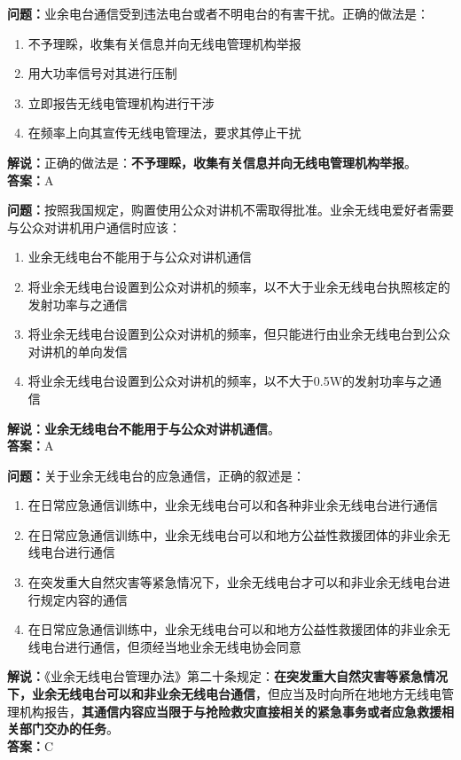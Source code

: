 \bigskip


\noindent\textbf{问题：}业余电台通信受到违法电台或者不明电台的有害干扰。正确的做法是：
\begin{enumerate}[label=\Alph*), leftmargin=3em]
	\item 不予理睬，收集有关信息并向无线电管理机构举报
	\item 用大功率信号对其进行压制
	\item 立即报告无线电管理机构进行干涉
	\item 在频率上向其宣传无线电管理法，要求其停止干扰
\end{enumerate}
\noindent\textbf{解说：}正确的做法是：\textbf{不予理睬，收集有关信息并向无线电管理机构举报}。\\\noindent\textbf{答案：}A


\bigskip


\noindent\textbf{问题：}按照我国规定，购置使用公众对讲机不需取得批准。业余无线电爱好者需要与公众对讲机用户通信时应该：
\begin{enumerate}[label=\Alph*), leftmargin=3em]
	\item 业余无线电台不能用于与公众对讲机通信
	\item 将业余无线电台设置到公众对讲机的频率，以不大于业余无线电台执照核定的发射功率与之通信
	\item 将业余无线电台设置到公众对讲机的频率，但只能进行由业余无线电台到公众对讲机的单向发信
	\item 将业余无线电台设置到公众对讲机的频率，以不大于0.5W的发射功率与之通信
\end{enumerate}
\noindent\textbf{解说：}\textbf{业余无线电台不能用于与公众对讲机通信}。\\\noindent\textbf{答案：}A


\bigskip


\noindent\textbf{问题：}关于业余无线电台的应急通信，正确的叙述是：
\begin{enumerate}[label=\Alph*), leftmargin=3em]
	\item 在日常应急通信训练中，业余无线电台可以和各种非业余无线电台进行通信
	\item 在日常应急通信训练中，业余无线电台可以和地方公益性救援团体的非业余无线电台进行通信
	\item 在突发重大自然灾害等紧急情况下，业余无线电台才可以和非业余无线电台进行规定内容的通信
	\item 在日常应急通信训练中，业余无线电台可以和地方公益性救援团体的非业余无线电台进行通信，但须经当地业余无线电协会同意
\end{enumerate}
\noindent\textbf{解说：}《业余无线电台管理办法》第二十条规定：\textbf{在突发重大自然灾害等紧急情况下，业余无线电台可以和非业余无线电台通信}，但应当及时向所在地地方无线电管理机构报告，\textbf{其通信内容应当限于与抢险救灾直接相关的紧急事务或者应急救援相关部门交办的任务}。\\\noindent\textbf{答案：}C




